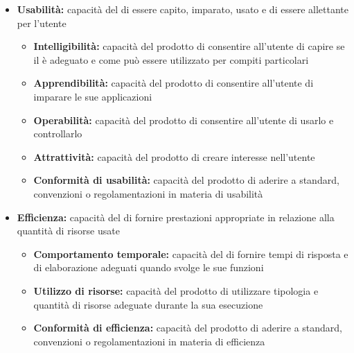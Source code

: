 \documentclass[12pt,a4paper]{article}
\begin{document}
\begin{itemize}
		\item \textbf{Usabilità:} capacità del  di essere capito, imparato, usato e di essere allettante per l'utente
		\begin{itemize}
			\item \textbf{Intelligibilità:} capacità del prodotto  di consentire all'utente di capire se il  è adeguato e come può essere utilizzato per compiti	particolari
			\item \textbf{Apprendibilità:} capacità del prodotto  di consentire all'utente di imparare le sue applicazioni
			\item \textbf{Operabilità:} capacità del prodotto  di consentire all'utente di usarlo e controllarlo
			\item \textbf{Attrattività:} capacità del prodotto  di creare interesse nell'utente
			\item \textbf{Conformità di usabilità:} capacità del prodotto  di aderire a standard, convenzioni o regolamentazioni in materia di usabilità
		\end{itemize}
		
		\item \textbf{Efficienza:} capacità del  di fornire prestazioni appropriate in relazione alla quantità di risorse usate
		\begin{itemize}
			\item \textbf{Comportamento temporale:} capacità del  di fornire tempi di risposta e di elaborazione adeguati quando svolge le sue funzioni
			\item \textbf{Utilizzo di risorse:} capacità del prodotto  di utilizzare tipologia e quantità di risorse adeguate durante la sua esecuzione
			\item \textbf{Conformità di efficienza:} capacità del prodotto  di aderire a standard, convenzioni o regolamentazioni in materia di efficienza
		\end{itemize}
		

\end{itemize}
\end{document}
